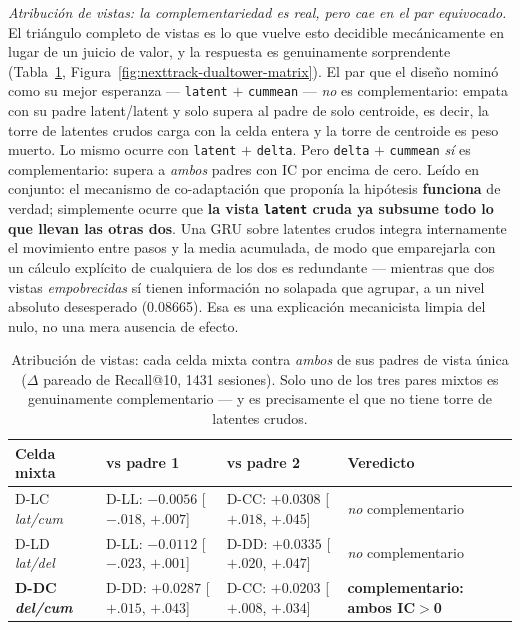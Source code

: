 \documentclass[11pt]{article}
\newcommand{\best}[1]{\textbf{#1}}
\begin{document}
\emph{Atribución de vistas: la complementariedad es real, pero cae en el par
equivocado.} El triángulo completo de vistas es lo que vuelve esto decidible
mecánicamente en lugar de un juicio de valor, y la respuesta es genuinamente
sorprendente (Tabla~\ref{tab:nexttrack-dualtower-views},
Figura~\ref{fig:nexttrack-dualtower-matrix}). El par que el diseño nominó como su
mejor esperanza --- \texttt{latent} $+$ \texttt{cummean} --- \emph{no} es
complementario: empata con su padre latent/latent y solo supera al padre de solo
centroide, es decir, la torre de latentes crudos carga con la celda entera y la
torre de centroide es peso muerto. Lo mismo ocurre con \texttt{latent} $+$
\texttt{delta}. Pero \texttt{delta} $+$ \texttt{cummean} \emph{sí} es
complementario: supera a \emph{ambos} padres con IC por encima de cero. Leído en
conjunto: el mecanismo de co-adaptación que proponía la hipótesis
\textbf{funciona} de verdad; simplemente ocurre que \textbf{la vista
\texttt{latent} cruda ya subsume todo lo que llevan las otras dos}. Una GRU sobre
latentes crudos integra internamente el movimiento entre pasos y la media
acumulada, de modo que emparejarla con un cálculo explícito de cualquiera de los
dos es redundante --- mientras que dos vistas \emph{empobrecidas} sí tienen
información no solapada que agrupar, a un nivel absoluto desesperado
(\num{0.08665}). Esa es una explicación mecanicista limpia del nulo, no una mera
ausencia de efecto.

\begin{table}[ht]
  \centering
  \caption{Atribución de vistas: cada celda mixta contra \emph{ambos} de sus
  padres de vista única ($\Delta$ pareado de Recall@10, \num{1431} sesiones).
  Solo uno de los tres pares mixtos es genuinamente complementario --- y es
  precisamente el que no tiene torre de latentes crudos.}
  \label{tab:nexttrack-dualtower-views}
  {\scriptsize\setlength{\tabcolsep}{3.4pt}\begin{tabular}{llll}
    \toprule
    Celda mixta & vs padre 1 & vs padre 2 & Veredicto \\
    \midrule
    D-LC \emph{lat/cum} & D-LL: $-0.0056$ [$-.018$, $+.007$] & D-CC: $+0.0308$ [$+.018$, $+.045$] & \emph{no} complementario \\
    D-LD \emph{lat/del} & D-LL: $-0.0112$ [$-.023$, $+.001$] & D-DD: $+0.0335$ [$+.020$, $+.047$] & \emph{no} complementario \\
    \best{D-DC \emph{del/cum}} & D-DD: $+0.0287$ [$+.015$, $+.043$] & D-CC: $+0.0203$ [$+.008$, $+.034$] & \best{complementario: ambos IC$>$0} \\
    \bottomrule
  \end{tabular}}
\end{table}
\end{document}
